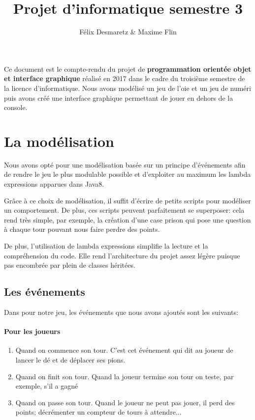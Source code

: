 \documentclass{article}
\title{Projet d'informatique semestre 3}
\author{Félix Desmaretz \& Maxime Flin}
\date{}
\begin{document}
\maketitle

Ce document est le compte-rendu du projet de \textbf{programmation orientée objet et interface graphique} réalisé en 2017 dans le cadre du troisième semestre de la licence d'informatique. Nous avons modélisé un jeu de l'oie et un jeu de numéri puis avons créé une interface graphique permettant de jouer en dehors de la console.
\tableofcontents
\newpage

\section{La modélisation}
Nous avons opté pour une modélisation basée sur un principe d'événements afin de rendre le jeu le plus modulable possible et d'exploiter au maximum les lambda expressions apparues dans Java8. 

Grâce à ce choix de modélisation, il suffit d'écrire de petits scripts pour modéliser un comportement. De plus, ces scripts peuvent parfaitement se superposer: cela rend très simple, par exemple, la création d'une case prison qui pose une question à chaque tour pouvant nous faire perdre des points.

De plus, l'utilisation de lambda expressions simplifie la lecture et la compréhension du code. Elle rend l'architecture du projet assez légère puisque pas encombrée par plein de classes héritées.

\subsection{Les événements}

Dans pour notre jeu, les événements que nous avons ajoutés sont les suivants:
\paragraph{Pour les joueurs}
\begin{enumerate}
\item Quand on commence son tour. C'est cet événement qui dit au joueur de lancer le dé et de déplacer ses pions.
\item Quand on finit son tour. Quand la joueur termine son tour on teste, par exemple, s'il a gagné
\item Quand on passe son tour. Quand le joueur ne peut pas jouer, il perd des points; décrémenter un compteur de tours à attendre...
\end{enumerate}
\end{document}
